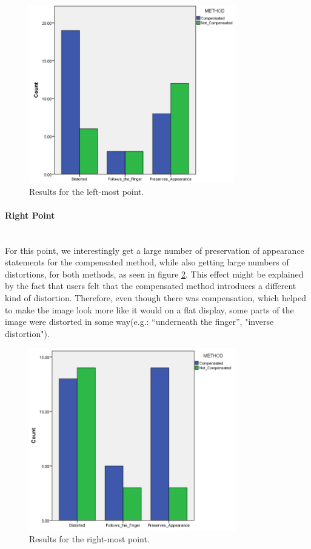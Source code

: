 \documentclass[]{article}
\begin{document}
\begin{figure}[!h]
    \centering
    \includegraphics[width=0.80\textwidth]{figures/results/LeftPointGraph.PNG}
    \caption{Results for the left-most point.}
    \label{fig:LeftPointGraph}
\end{figure}

\paragraph{Right Point}\mbox{}\\

For this point, we interestingly get a large number of preservation of appearance statements for the compensated method, while also getting large numbers of distortions, for both methods, as seen in figure \ref{fig:RightPointGraph.PNG}. This effect might be explained by the fact that users felt that the compensated method introduces a different kind of distortion. Therefore, even though there was compensation, which helped to make the image look more like it would on a flat display, some parts of the image were distorted in some way(e.g.: “underneath the finger”, "inverse distortion").


\begin{figure}[!h]
    \centering
    \includegraphics[width=0.80\textwidth]{figures/results/RightPointGraph.PNG}
    \caption{Results for the right-most point.}
    \label{fig:RightPointGraph.PNG}
\end{figure}
\end{document}
